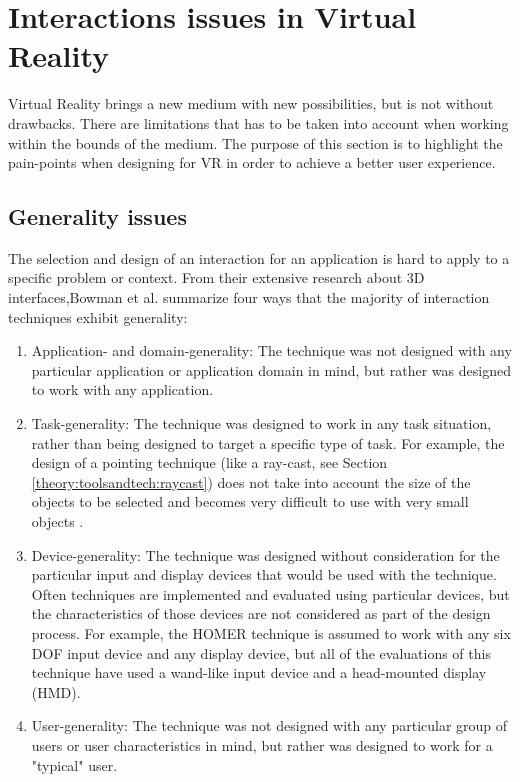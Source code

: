 \section{Interactions issues in Virtual Reality}
\label{theory:interaction-issues}
Virtual Reality brings a new medium with new possibilities, but is not without drawbacks. There are limitations that has to be taken into account when working within the bounds of the medium. The purpose of this section is to highlight the pain-points when designing for VR in order to achieve a better user experience.

\subsection{Generality issues}
The selection and design of an interaction for an application is hard to apply to a specific problem or context. From their extensive research about 3D interfaces,Bowman et al. \cite{interactions:Bowman2006} summarize four ways that the majority of interaction techniques exhibit generality:
\begin{enumerate}
  \item Application- and domain-generality: The technique was not designed with any particular application or application domain in mind, but rather was designed to work with any application.
  \item Task-generality: The technique was designed to work in any task situation, rather than being designed to target a specific type of task. For example, the design of a pointing technique (like a ray-cast, see Section \ref{theory:toolsandtech:raycast}) does not take into account the size of the objects to be selected and becomes very difficult to use with very small objects \cite{interaction:Poupyrev1997}.
  \item Device-generality: The technique was designed without consideration for the particular input and display devices that would be used with the technique. Often techniques are implemented and evaluated using particular devices, but the characteristics of those devices are not considered as part of the design process. For example, the HOMER technique\cite{interactions:Bowman1997} is assumed to work with any six DOF input device and any display device, but all of the evaluations of this technique have used a wand-like input device and a head-mounted display (HMD).
  \item User-generality: The technique was not designed with any particular group of users or user characteristics in mind, but rather was designed to work for a "typical" user.
\end{enumerate}

